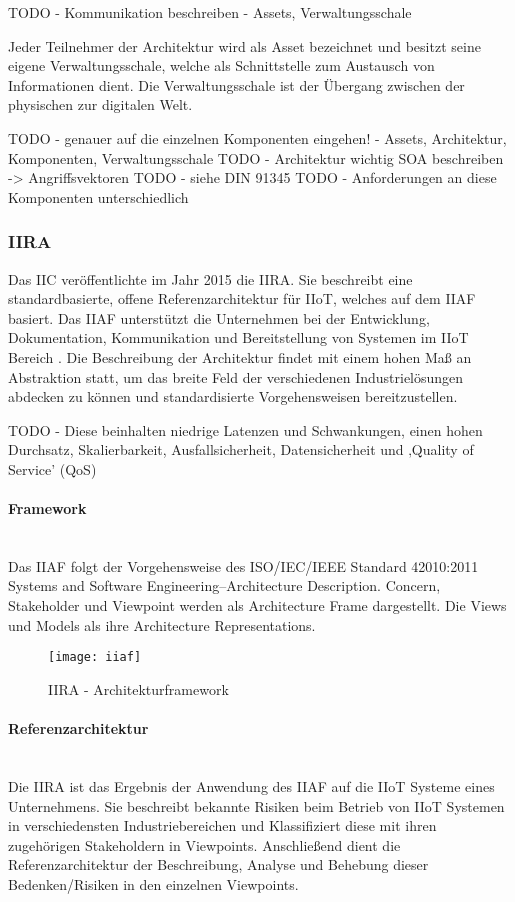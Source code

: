 TODO - Kommunikation beschreiben - Assets, Verwaltungsschale

Jeder Teilnehmer der Architektur wird als Asset bezeichnet und besitzt seine eigene Verwaltungsschale, welche als Schnittstelle zum Austausch von Informationen dient. Die Verwaltungsschale ist der Übergang zwischen der physischen zur digitalen Welt.

TODO - genauer auf die einzelnen Komponenten eingehen! - Assets, Architektur, Komponenten, Verwaltungsschale
TODO - Architektur wichtig SOA beschreiben -> Angriffsvektoren
TODO - siehe DIN 91345
TODO - Anforderungen an diese Komponenten unterschiedlich

\subsubsection{IIRA}
Das \ac{IIC} veröffentlichte im Jahr 2015 die \ac{IIRA}. Sie beschreibt eine standardbasierte, offene Referenzarchitektur für \ac{IIoT}, welches auf dem \ac{IIAF} basiert. Das \ac{IIAF} unterstützt die Unternehmen bei der Entwicklung, Dokumentation, Kommunikation und Bereitstellung von Systemen im \ac{IIoT} Bereich \cite{iira2017}. Die Beschreibung der Architektur findet mit einem hohen Maß an Abstraktion statt, um das breite Feld der verschiedenen Industrielösungen abdecken zu können und standardisierte Vorgehensweisen bereitzustellen.

TODO - Diese beinhalten niedrige Latenzen und Schwankungen, einen hohen Durchsatz, Skalierbarkeit, Ausfallsicherheit, Datensicherheit und ‚Quality of Service’ (QoS)

\paragraph{Framework}\mbox{}\\
Das \ac{IIAF} folgt der Vorgehensweise des ISO/IEC/IEEE Standard 42010:2011 Systems and Software Engineering–Architecture Description. Concern, Stakeholder und Viewpoint werden als Architecture Frame dargestellt. Die Views und Models als ihre Architecture Representations.

\begin{figure}[h]
  \centering
  \texttt{[image: iiaf]}
  \caption{IIRA - Architekturframework} 
  \label{Kap2:IIRA - Architekturframework}
\end{figure}

\clearpage

\paragraph{Referenzarchitektur}\mbox{}\\
Die \ac{IIRA} ist das Ergebnis der Anwendung des \ac{IIAF} auf die \ac{IIoT} Systeme eines Unternehmens. Sie beschreibt bekannte Risiken beim Betrieb von \ac{IIoT} Systemen in verschiedensten Industriebereichen und Klassifiziert diese mit ihren zugehörigen Stakeholdern in Viewpoints. Anschließend dient die Referenzarchitektur der Beschreibung, Analyse und Behebung dieser Bedenken/Risiken in den einzelnen Viewpoints.

